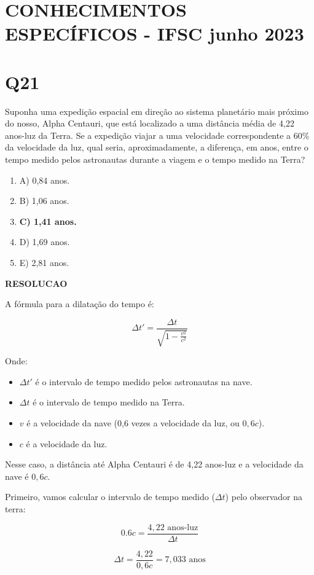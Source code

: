 \documentclass{article}
\begin{document}
\section*{CONHECIMENTOS ESPECÍFICOS - IFSC junho 2023}
\section*{Q21}
Suponha uma expedição espacial em direção ao sistema planetário mais próximo do
nosso, Alpha Centauri, que está localizado a uma distância média de 4,22 anos-luz da Terra. Se a
expedição viajar a uma velocidade correspondente a 60\% da velocidade da luz, qual seria,
aproximadamente, a diferença, em anos, entre o tempo medido pelos astronautas durante a viagem
e o tempo medido na Terra?

\begin{enumerate}
\item A) 0,84 anos.
\item B) 1,06 anos.
\item \textbf{\Large C) 1,41 anos.}
\item D) 1,69 anos.
\item E) 2,81 anos.
\end{enumerate}

\textbf{RESOLUCAO}

A fórmula para a dilatação do tempo é:

\[ \Delta t' = \frac{\Delta t}{\sqrt{1 - \frac{v^2}{c^2}}} \]

Onde:
\begin{itemize}
\item \( \Delta t' \) é o intervalo de tempo medido pelos astronautas na nave.
\item \( \Delta t \) é o intervalo de tempo medido na Terra.
\item \( v \) é a velocidade da nave (0,6 vezes a velocidade da luz, ou \( 0,6c \)).
\item \( c \) é a velocidade da luz.
\end{itemize}
Nesse caso, a distância até Alpha Centauri é de 4,22 anos-luz e a velocidade da nave é \( 0,6c \).

Primeiro, vamos calcular o intervalo de tempo medido ($\Delta t$) pelo observador na terra:

\begin{equation}
    0.6c = \frac{4,22 \textrm{ anos-luz}}{\Delta t} 
\end{equation}
    
\begin{equation} 
    \Delta t = \frac{4,22}{0,6c} = 7,033 \textrm{ anos}
\end{equation}
\end{document}
